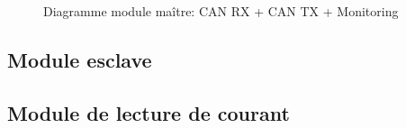 		\begin{figure}[H]
			\centering
			\caption{Diagramme module maître: CAN RX + CAN TX + Monitoring }
			\label{fig:diagrammefonctionnelcanmonitoring}
		\end{figure}
		
		
	\subsection{Module esclave}
		\paragraph*{}
	\subsection{Module de lecture de courant}
		\paragraph*{}
